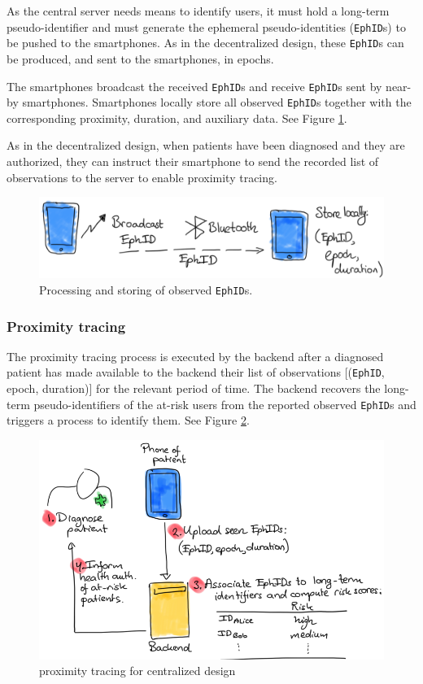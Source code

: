 \documentclass[10.8pt,a4paper]{article}
\begin{document}
As the central server needs means to identify users, it must hold a long-term
pseudo-identifier and must generate the ephemeral pseudo-identities (\texttt{EphID}s) to be pushed to the smartphones. As in the decentralized design, these \texttt{EphID}s can be produced, and sent to the smartphones, in epochs.

The smartphones broadcast the received \texttt{EphID}s and receive \texttt{EphID}s sent by near-by smartphones. Smartphones locally store all observed \texttt{EphID}s together with the corresponding proximity, duration, and auxiliary data. See Figure \ref{ZZ}.

As in the decentralized design, when patients have been diagnosed and they are authorized,
they can instruct their smartphone to send the recorded list of observations to the server to enable proximity tracing.
\begin{figure}[H]
\centering
\includegraphics[scale=0.4]{fig/ZZ}
\caption{Processing and storing of observed \texttt{EphID}s.}
\label{ZZ}
\end{figure}
\subsubsection{Proximity tracing}
The proximity tracing process is executed by the backend after a diagnosed patient has
made available to the backend their list of observations [(\texttt{EphID}, epoch, duration)] for the relevant period of time. The backend recovers the long-term pseudo-identifiers of the at-risk users from the reported observed \texttt{EphID}s and triggers a process to identify them. See Figure \ref{ZY}.
\begin{figure}[H]
\centering
\includegraphics[scale=0.55]{fig/ZY}
\caption{proximity tracing for centralized design}
\label{ZY}
\end{figure}
\end{document}

